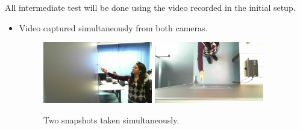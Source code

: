 \documentclass[a4paper,12pt]{article}
\begin{document}
All intermediate test will be done using the video recorded in the initial setup. 
\begin{itemize}
\item Video captured simultaneously from both cameras. 
\begin{figure}[H]
    \begin{center}
	\includegraphics[width=0.45\textwidth]{FrameSide}
	\includegraphics[width=0.45\textwidth]{FrameUp}
	\caption{Two snapshots taken simultaneously.}

	\label{fig:video}
    \end{center}
\end{figure}


\end{itemize}
\end{document}
